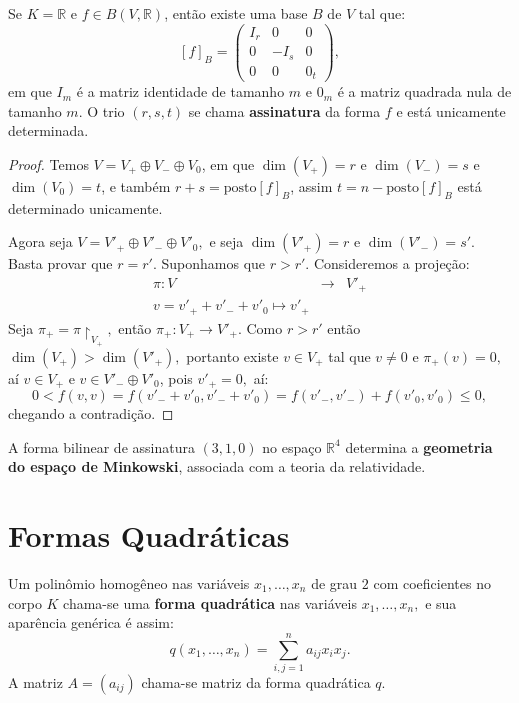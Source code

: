 \documentclass[11pt,twoside,a4paper]{book}
\begin{document}
\begin{corolario}
Se $K=\mathbb{R}$ e $f\in B(V,\mathbb{R})$, então existe uma base $B$ de $V$ tal que:
\[
[f]_B=\begin{pmatrix}
I_r&0&0\\0&-I_s&0\\0&0&0_t
\end{pmatrix},
\]
em que $I_m$ é a matriz identidade de tamanho $m$ e $0_m$ é a matriz quadrada nula de tamanho $m.$ O trio $(r,s,t)$ se chama \textbf{assinatura} da forma $f$ e está unicamente determinada.
\end{corolario}
\begin{proof}
Temos $V=V_+\oplus V_-\oplus V_0$, em que $\dim(V_+)=r$ e $\dim(V_-)=s$ e $\dim(V_0)=t$, e também $r+s=\mathrm{posto}[f]_B$, assim $t=n-\mathrm{posto}[f]_B$ está determinado unicamente.

\medskip
\noindent
Agora seja $V=V'_+\oplus V'_-\oplus V'_0,$ e seja $\dim(V'_+)=r$ e $\dim(V'_-)=s'$. Basta provar que $r=r'.$ Suponhamos que $r>r'.$ Consideremos a projeção:
\[
\begin{array}{rcl}
\pi:V&\rightarrow&V'_+\\
v=v'_++v'_-+v'_0\mapsto v'_+
\end{array}
\]
Seja $\pi_+=\pi\upharpoonright_{V_+},$ então $\pi_+:V_+\rightarrow V'_+.$ Como $r>r'$ então $\dim(V_+)>\dim(V'_+),$ portanto existe $v\in V_+$ tal que $v\neq 0$ e $\pi_+(v)=0,$ aí $v\in V_+$ e $v\in V'_-\oplus V'_0$, pois $v'_+=0,$ aí:
\[
0<f(v,v)=f(v'_-+v'_0,v'_-+v'_0)=f(v'_-,v'_-)+f(v'_0,v'_0)\leq 0,
\]
chegando a contradição.
\end{proof}

\begin{observacao}
A forma bilinear de assinatura $(3,1,0)$ no espaço $\mathbb{R}^4$ determina a \textbf{geometria do espaço de Minkowski}, associada com a teoria da relatividade.
\end{observacao}

\section{Formas Quadráticas}

\begin{definicao}
Um polinômio homogêneo nas variáveis $x_1,\dots,x_n$ de grau $2$ com coeficientes no corpo $K$ chama-se uma \textbf{forma quadrática} nas variáveis $x_1,\dots,x_n,$ e sua aparência genérica é assim:
\[
q(x_1,\dots,x_n)=\sum_{i,j=1}^na_{ij}x_ix_j.
\]
A matriz $A=(a_{ij})$ chama-se matriz da forma quadrática $q.$
\end{definicao}
\end{document}
